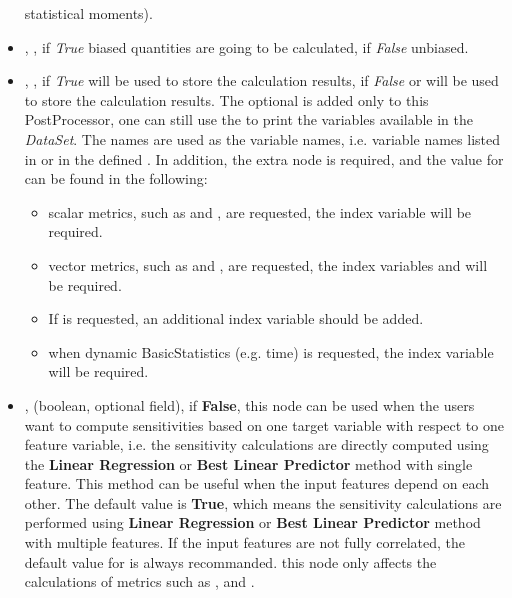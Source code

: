 \begin{itemize}
   statistical moments).
  \item {}, , if \textit{True} biased
  quantities are going to be calculated, if \textit{False} unbiased.
  \item {}, , if \textit{True} 
    will be used to store the calculation results, if \textit{False}  or 
    will be used to store the calculation results.
    \nb The optional  is added only to this PostProcessor, one can still use the 
    to print the variables available in the \textit{DataSet}. The  names are used as the
    variable names, i.e. variable names listed in  or  in the defined .
    In addition, the extra node  is required, and the value for  can be found in the following:
    \begin{itemize}
      \item scalar metrics, such as  and ,
        are requested, the index variable  will be required.
      \item vector metrics, such as  and , are requested, the index variables
         and  will be required.
      \item If  is requested, an additional index variable  should be added.
      \item when dynamic BasicStatistics (e.g. time) is requested, the index variable   will be required.
    \end{itemize}
\item {}, \xmlDesc(boolean, optional field), if \textbf{False}, this node can be used when
    the users want to compute sensitivities based on one target variable with respect to one feature variable,
    i.e. the sensitivity calculations are directly computed using the \textbf{Linear Regression} or
    \textbf{Best Linear Predictor} method with single feature. This method can be useful when the input features
    depend on each other. The default value is \textbf{True}, which means the sensitivity calculations are performed
    using \textbf{Linear Regression} or \textbf{Best Linear Predictor} method with multiple features. If the input
    features are not fully correlated, the default value for  is always recommanded.
    \nb this node only affects the calculations of metrics such as ,
     and .
\end{itemize}
